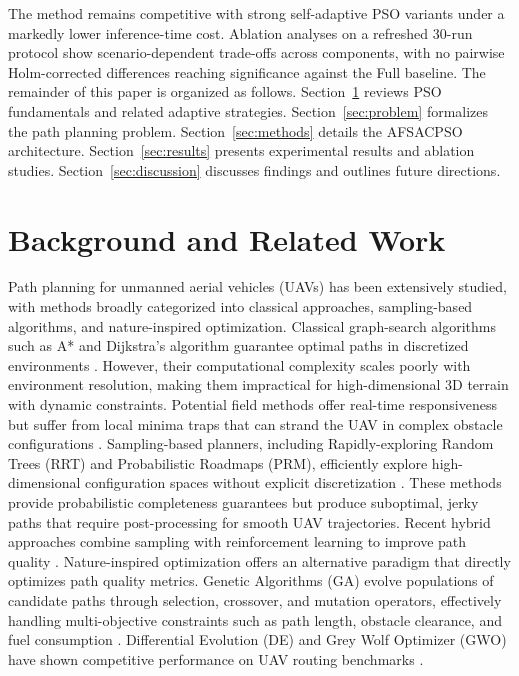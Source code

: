 \documentclass[final,5p,times]{elsarticle}
\begin{document}
The method remains competitive with strong self-adaptive PSO variants under a markedly lower inference-time cost.
Ablation analyses on a refreshed 30-run protocol show scenario-dependent trade-offs across components, with no pairwise Holm-corrected differences reaching significance against the Full baseline. The remainder of this paper is organized as follows.
Section~\ref{sec:background} reviews PSO fundamentals and related adaptive strategies.
Section~\ref{sec:problem} formalizes the path planning problem.
Section~\ref{sec:methods} details the AFSACPSO architecture.
Section~\ref{sec:results} presents experimental results and ablation studies.
Section~\ref{sec:discussion} discusses findings and outlines future directions.
\section{Background and Related Work}
\label{sec:background} Path planning for unmanned aerial vehicles (UAVs) has been extensively studied, with methods broadly categorized into classical approaches, sampling-based algorithms, and nature-inspired optimization.
Classical graph-search algorithms such as A* and Dijkstra's algorithm guarantee optimal paths in discretized environments \cite{Hart1968A}.
However, their computational complexity scales poorly with environment resolution, making them impractical for high-dimensional 3D terrain with dynamic constraints.
Potential field methods offer real-time responsiveness but suffer from local minima traps that can strand the UAV in complex obstacle configurations \cite{Mac2016Heuristic}.
Sampling-based planners, including Rapidly-exploring Random Trees (RRT) and Probabilistic Roadmaps (PRM), efficiently explore high-dimensional configuration spaces without explicit discretization \cite{Karur2021A}.
These methods provide probabilistic completeness guarantees but produce suboptimal, jerky paths that require post-processing for smooth UAV trajectories.
Recent hybrid approaches combine sampling with reinforcement learning to improve path quality \cite{Faust2017PRMRL}. Nature-inspired optimization offers an alternative paradigm that directly optimizes path quality metrics.
Genetic Algorithms (GA) evolve populations of candidate paths through selection, crossover, and mutation operators, effectively handling multi-objective constraints such as path length, obstacle clearance, and fuel consumption \cite{Debnath2024An}.
Differential Evolution (DE) and Grey Wolf Optimizer (GWO) have shown competitive performance on UAV routing benchmarks \cite{AitSaadi2022UAV}.
\end{document}
